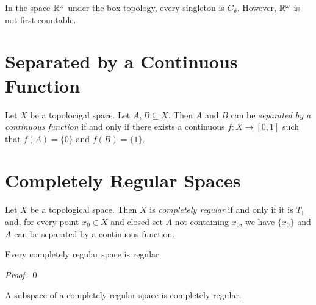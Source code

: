\begin{example}
    In the space $\mathbb{R}^\omega$ under the box topology, every singleton is $G_\delta$.
    However, $\mathbb{R}^\omega$ is not first countable.
\end{example}

\section{Separated by a Continuous Function}

\begin{definition}
    Let $X$ be a topolocigal space. Let $A, B \subseteq X$. Then $A$ and $B$
    can be \emph{separated by a continuous function} if and only if there exists
    a continuous $f : X \rightarrow [0,1]$ such that $f(A) = \{0\}$ and
    $f(B) = \{1\}$.
\end{definition}

\section{Completely Regular Spaces}

\begin{definition}
    Let $X$ be a topological space. Then $X$ is \emph{completely regular} if
    and only if it is $T_1$ and, for every point $x_0 \in X$ and closed set
    $A$ not containing $x_0$, we have $\{x_0\}$ and $A$ can be separated by a
    continuous function.
\end{definition}

\begin{proposition}
    Every completely regular space is regular.
\end{proposition}

\begin{proof}
    \pf
    \qed
\end{proof}

\begin{proposition}
    A subspace of a completely regular space is completely regular.
\end{proposition}

